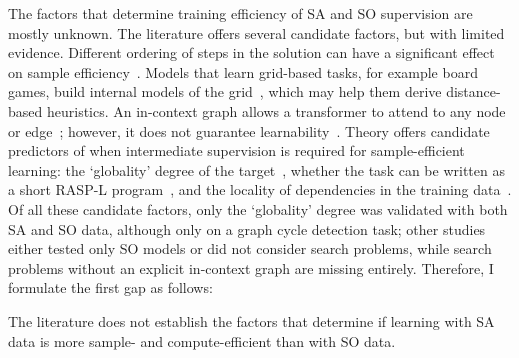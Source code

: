 The factors that determine training efficiency of SA and SO supervision are mostly unknown.
The literature offers several candidate factors, but with limited evidence.
Different ordering of steps in the solution can have a significant effect on sample efficiency~\citep{bachmannPitfallsNexttokenPrediction2025,leeTeachingArithmeticSmall2023}.
Models that learn grid-based tasks, for example board games, build internal models of the grid~\citep{liEmergentWorldRepresentations2024,spiesTransformersUseCausal2024}, which may help them derive distance-based heuristics.
An in-context graph allows a transformer to attend to any node or edge~\citep{saparovTransformersStruggleLearn2025}; however, it does not guarantee learnability~\citep{bachmannPitfallsNexttokenPrediction2025}.
Theory offers candidate predictors of when intermediate supervision is required for sample-efficient learning: the `globality' degree of the target~\citep{abbeHowFarCan2024}, whether the task can be written as a short RASP-L program~\citep{zhouWhatAlgorithmsCan2023}, and the locality of dependencies in the training data~\citep{prystawskiWhyThinkStep2023}.
Of all these candidate factors, only the `globality' degree was validated with both SA and SO data, although only on a graph cycle detection task; other studies either tested only SO models or did not consider search problems, while search problems without an explicit in-context graph are missing entirely.
Therefore, I formulate the first gap as follows:

\begin{tcolorbox}[title=Gap 1: Efficiency, colback=ThesisGreen!5, colframe=ThesisGreen, fonttitle=\bfseries, fontupper=\itshape]
    The literature does not establish the factors that determine if learning with SA data is more sample- and compute-efficient than with SO data.
\end{tcolorbox}

